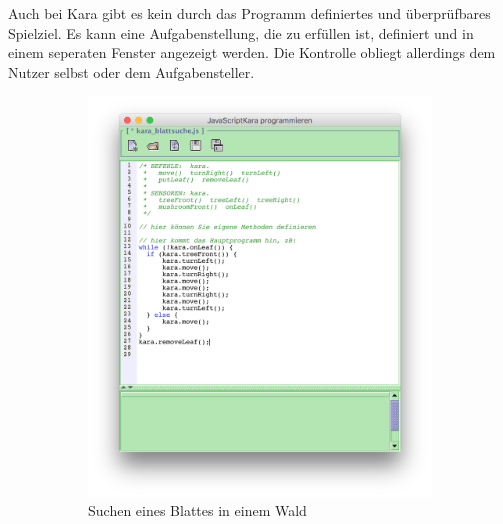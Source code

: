 Auch bei Kara gibt es kein durch das Programm definiertes und überprüfbares Spielziel. Es kann eine Aufgabenstellung, die zu erfüllen ist, definiert und in einem seperaten Fenster angezeigt werden. Die Kontrolle obliegt allerdings dem Nutzer selbst oder dem Aufgabensteller.

\begin{figure}
    \begin{subfigure}[b]{0.5\textwidth}
        \includegraphics[width=\textwidth]{gfx/related-kara-code.png}
        \caption{Suchen eines Blattes in einem Wald}
        \label{fig:related:kara:code}
    \end{subfigure}
    \begin{subfigure}[b]{0.5\textwidth}

\end{subfigure}
\end{figure}
